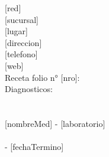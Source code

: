 \documentclass{article}
\begin{document}
\noindent [doctor]	\hfill \phantom	\hfill [red] \\
\noindent [pos]		\hfill \phantom	\hfill [sucursal] \\
\noindent [esp]		\hfill \phantom	\hfill [lugar] \\
\noindent [rut]		\hfill \phantom	\hfill [direccion] \\
\noindent [regss]	\hfill \phantom	\hfill [telefono] \\
\noindent [regcm]	\hfill \phantom	\hfill [web] \\

\noindent Receta folio n° [nro]: \hfill \phantom \hfill \\ 

\noindent Diagnosticos: \\ \\
\noindent [diagnostico] \\

[nombreMed] - [laboratorio] \hfill \phantom \hfill \\
\indent [cantidad] [unidad] [frecuencia] [duracion] \hfill \phantom \hfill \\
\indent [fechaInicio] - [fechaTermino] \hfill \phantom \hfill \\
\indent [comentario] \hfill \phantom \hfill \\
\end{document}
